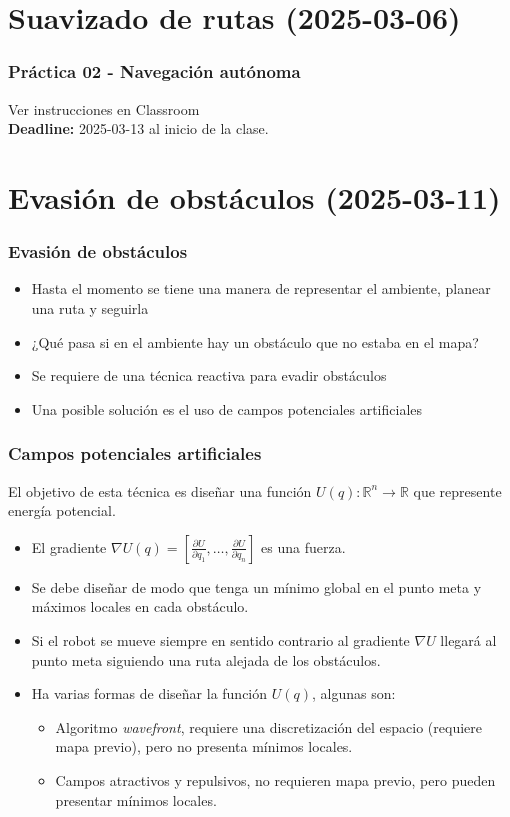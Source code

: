 \section{Suavizado de rutas (2025-03-06)} %
\begin{frame}[containsverbatim]\frametitle{Práctica 02 - Navegación autónoma}
  Ver instrucciones en Classroom
  \[\]
  \textbf{Deadline: } 2025-03-13 al inicio de la clase. 
\end{frame}

\section{Evasión de obstáculos (2025-03-11)}
\begin{frame}\frametitle{Evasión de obstáculos}
  \begin{itemize}
  \item Hasta el momento se tiene una manera de representar el ambiente, planear una ruta y seguirla
  \item ¿Qué pasa si en el ambiente hay un obstáculo que no estaba en el mapa?
  \item Se requiere de una técnica reactiva para evadir obstáculos
  \item Una posible solución es el uso de campos potenciales artificiales
  \end{itemize}
\end{frame}

\begin{frame}\frametitle{Campos potenciales artificiales}
  El objetivo de esta técnica es diseñar una función $U(q):\mathbb{R}^n\rightarrow \mathbb{R}$ que represente energía potencial.
  \begin{itemize}
  \item El gradiente $\nabla U(q) = \left[\frac{\partial U}{\partial q_1},\dots,\frac{\partial U}{\partial q_n}\right]$ es una fuerza.
  \item Se debe diseñar de modo que tenga un mínimo global en el punto meta y máximos locales en cada obstáculo.
  \item Si el robot se mueve siempre en sentido contrario al gradiente $\nabla U$ llegará al punto meta siguiendo una ruta alejada de los obstáculos.
  \item Ha varias formas de diseñar la función $U(q)$, algunas son:
    \begin{itemize}
    \item Algoritmo \textit{wavefront}, requiere una discretización del espacio (requiere mapa previo), pero no presenta mínimos locales.
    \item Campos atractivos y repulsivos, no requieren mapa previo, pero pueden presentar mínimos locales. 
    \end{itemize}
  \end{itemize}
\end{frame}

